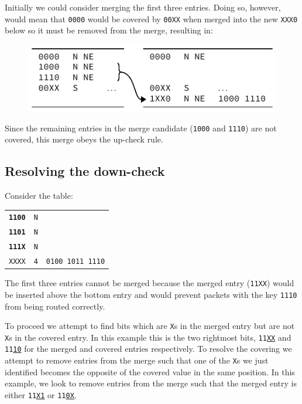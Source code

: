 \documentclass[conference]{IEEEtran}
\newcommand{\mytt}[1]{\texttt{\footnotesize#1}}
\begin{document}
  \noindent Initially we could consider merging the first three entries.
  Doing so, however, would mean that \mytt{0000} would be covered by \mytt{00XX} when merged into the new \mytt{XXX0} below so it must be removed from the merge, resulting in:

  \begin{figure}[H]
    \centering
    \includegraphics{figures/upcheck_resolve_example_2}
  \end{figure}

  \noindent Since the remaining entries in the merge candidate (\mytt{1000} and \mytt{1110}) are not covered, this merge obeys the up-check rule.

  \subsection{Resolving the down-check}
  
  Consider the table:

  \begin{table}[H]
    \centering
    \begin{tabular}{c l l}
      \toprule
      \textbf{\texttt{1100}} & \texttt{N} \\
      \textbf{\texttt{1101}} & \texttt{N} \\
      \textbf{\texttt{111X}} & \texttt{N} \\
      \texttt{XXXX} & \texttt{4} & \texttt{0100 1011 1110} \\
      \bottomrule
    \end{tabular}
  \end{table}

  The first three entries cannot be merged because the merged entry (\mytt{11XX}) would be inserted above the bottom entry and would prevent packets with the key \mytt{1110} from being routed correctly.

  To proceed we attempt to find bits which are \mytt{X}s in the merged entry but are not \mytt{X}s in the covered entry.
  In this example this is the two rightmost bits, \mytt{11\underline{XX}} and \mytt{11\underline{10}} for the merged and covered entries respectively.
  To resolve the covering we attempt to remove entries from the merge such that one of the \mytt{X}s we just identified becomes the opposite of the covered value in the same position.
  In this example, we look to remove entries from the merge such that the merged entry is either \mytt{11\underline{X1}} or \mytt{11\underline{0X}}.
\end{document}
